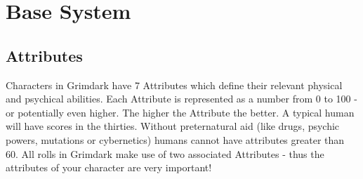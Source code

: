 \chapter{Base System}
\section{Attributes}\label{Attributes}
Characters in Grimdark have 7 Attributes which define their relevant physical and psychical abilities.
Each Attribute is represented as a number from 0 to 100 - or potentially even higher.
The higher the Attribute the better.
A typical human will have scores in the thirties.
Without preternatural aid (like drugs, psychic powers, mutations or cybernetics) humans cannot have attributes greater than 60. 
All rolls in Grimdark make use of two associated Attributes - thus the attributes of your character are very important!
